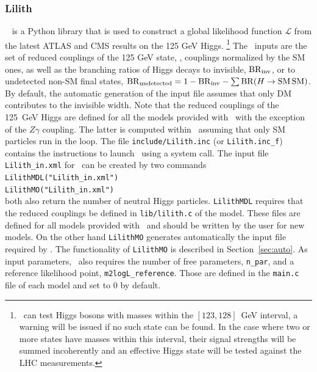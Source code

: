 \documentclass[12pt,a4paper]{article}
\begin{document}
\subsubsection{Lilith}\label{sec:lilith}


\lilith~\cite{Bernon:2015hsa,Kraml:2019sis,Bertrand:2020lyb} is a Python library that is used to construct a global likelihood function $\mathcal{L}$  from the latest ATLAS and CMS results on the 125 GeV Higgs.%
\footnote{\lilith\ can test Higgs bosons with masses within the $[123, 128]$~GeV interval, a warning will be issued if no such state can be found. In the case where two or more states have masses within this interval, their signal strengths will be summed incoherently and an effective Higgs state will be tested against the LHC measurements.}
The \lilith\ inputs are the set of reduced couplings of the 125 GeV state, \ie, couplings normalized by the SM ones, as well as the  branching ratios of Higgs decays to invisible, ${\rm BR}_{\rm inv}$, or to undetected non-SM final states,
${\rm BR}_{\rm undetected}=1-{\rm BR}_{\rm inv}-\sum {\rm BR}(H\rightarrow {\rm SM \,SM})$. 
By default, the automatic generation of the input file assumes that only DM contributes to the invisible width. 
Note that the reduced couplings of the 125~GeV Higgs are defined for all the models provided with \micro\ with the exception of the $Z\gamma$ coupling. The latter is computed within \lilith\ assuming that only SM particles run in the loop. 
The file \verb|include/Lilith.inc| (or \verb|Lilith.inc_f|) contains the instructions to launch \lilith\ using a system call. 
The input file  \verb|Lilith_in.xml| for \lilith\ can be created by two  commands\\

\noindent
\verb|LilithMDL("Lilith_in.xml")|\\
\verb|LilithMO("Lilith_in.xml")|\\

\noindent 
both also return the number of neutral Higgs particles.  
\verb|LilithMDL| requires that the  reduced couplings be defined in \verb|lib/lilith.c| of the model. These files are defined for all models provided with \micro\ and should be written by the user for new models. On the other hand \verb|LilithMO|  generates automatically the input file required by \lilith.
The functionality of \verb|LilithMO| is described in Section~\ref{sec:auto}. As input parameters, \lilith\ also requires 
 the number of free parameters, \verb|n_par|, and  a reference likelihood point, \verb|m2logL_reference|. Those are defined in the \verb|main.c| file of each model and set to 0 by default.
\end{document}
